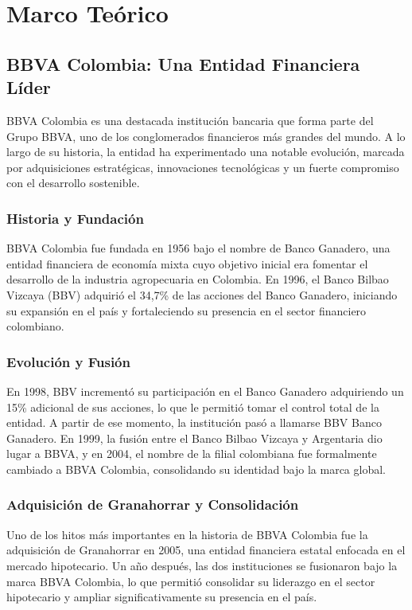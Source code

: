 \documentclass{matematicasud}
\begin{document}
\section{Marco Teórico}
\subsection{BBVA Colombia: Una Entidad Financiera Líder}

BBVA Colombia es una destacada institución bancaria que forma parte del Grupo BBVA, uno de los conglomerados financieros más grandes del mundo. A lo largo de su historia, la entidad ha experimentado una notable evolución, marcada por adquisiciones estratégicas, innovaciones tecnológicas y un fuerte compromiso con el desarrollo sostenible\cite{2}.

\subsubsection{Historia y Fundación}
BBVA Colombia fue fundada en 1956 bajo el nombre de Banco Ganadero, una entidad financiera de economía mixta cuyo objetivo inicial era fomentar el desarrollo de la industria agropecuaria en Colombia. En 1996, el Banco Bilbao Vizcaya (BBV) adquirió el 34,7\% de las acciones del Banco Ganadero, iniciando su expansión en el país y fortaleciendo su presencia en el sector financiero colombiano. \cite{2}

\subsubsection{Evolución y Fusión}
En 1998, BBV incrementó su participación en el Banco Ganadero adquiriendo un 15\% adicional de sus acciones, lo que le permitió tomar el control total de la entidad. A partir de ese momento, la institución pasó a llamarse BBV Banco Ganadero. En 1999, la fusión entre el Banco Bilbao Vizcaya y Argentaria dio lugar a BBVA, y en 2004, el nombre de la filial colombiana fue formalmente cambiado a BBVA Colombia, consolidando su identidad bajo la marca global. \cite{2}

\subsubsection{Adquisición de Granahorrar y Consolidación}
Uno de los hitos más importantes en la historia de BBVA Colombia fue la adquisición de Granahorrar en 2005, una entidad financiera estatal enfocada en el mercado hipotecario. Un año después, las dos instituciones se fusionaron bajo la marca BBVA Colombia, lo que permitió consolidar su liderazgo en el sector hipotecario y ampliar significativamente su presencia en el país. \cite{2}
\end{document}
